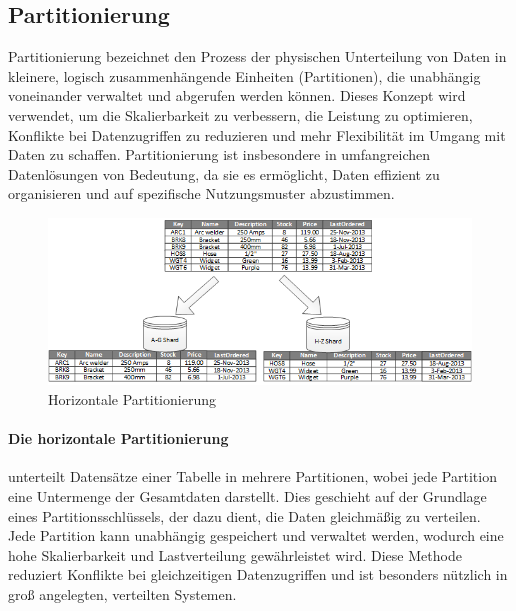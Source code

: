 
\subsection{Partitionierung}

Partitionierung bezeichnet den Prozess der physischen Unterteilung von Daten in kleinere, logisch zusammenhängende
Einheiten (Partitionen), die unabhängig voneinander verwaltet und abgerufen werden können.
Dieses Konzept wird verwendet, um die Skalierbarkeit zu verbessern, die Leistung zu optimieren, Konflikte
bei Datenzugriffen zu reduzieren und mehr Flexibilität im Umgang mit Daten zu schaffen.
Partitionierung ist insbesondere in umfangreichen Datenlösungen von Bedeutung, da sie es ermöglicht,
Daten effizient zu organisieren und auf spezifische Nutzungsmuster abzustimmen.

\begin{figure}[t]
  \centering
  \includegraphics[width=\linewidth]{../images/1}
  \caption{Horizontale Partitionierung~\cite{mic-datapar}}
    \label{fig:datapar}
\end{figure}

\paragraph{Die horizontale Partitionierung} unterteilt Datensätze einer Tabelle in mehrere Partitionen,
wobei jede Partition eine Untermenge der Gesamtdaten darstellt.
Dies geschieht auf der Grundlage eines Partitionsschlüssels, der dazu dient, die Daten gleichmäßig zu verteilen.
Jede Partition kann unabhängig gespeichert und verwaltet werden, wodurch eine hohe Skalierbarkeit und
Lastverteilung gewährleistet wird.
Diese Methode reduziert Konflikte bei gleichzeitigen Datenzugriffen und ist besonders nützlich in groß angelegten,
verteilten Systemen.
